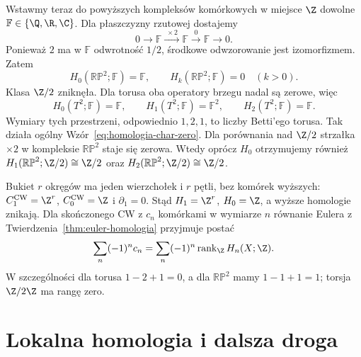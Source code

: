 \begin{przyklad}
\label{prz:zmiana-wspolczynnikow-rp2-torus}
Wstawmy teraz do powyższych kompleksów komórkowych
w miejsce $\Z$ dowolne
$\mathbb F\in\{\Q,\R,\C\}$.
Dla płaszczyzny rzutowej dostajemy
\[
 0\longrightarrow\mathbb F
 \xrightarrow{\;\times2\;}\mathbb F
 \xrightarrow{\;0\;}\mathbb F
 \longrightarrow0.
\]
Ponieważ $2$ ma w $\mathbb F$ odwrotność
$1/2$, środkowe odwzorowanie jest
izomorfizmem. Zatem
\[
 H_0(\mathbb{RP}^2;\mathbb F)=\mathbb F,
 \qquad H_k(\mathbb{RP}^2;\mathbb F)=0\quad(k>0).
\]
Klasa $\Z/2$ zniknęła. Dla torusa oba
operatory brzegu nadal są zerowe, więc
\[
 H_0(T^2;\mathbb F)=\mathbb F,\qquad
 H_1(T^2;\mathbb F)=\mathbb F^2,\qquad
 H_2(T^2;\mathbb F)=\mathbb F.
\]
Wymiary tych przestrzeni, odpowiednio
$1,2,1$, to liczby Betti'ego torusa.
Tak działa ogólny
Wzór~\eqref{eq:homologia-char-zero}.
Dla porównania nad $\Z/2$ strzałka
$\times2$ w kompleksie $\mathbb{RP}^2$
staje się zerowa. Wtedy oprócz $H_0$
otrzymujemy również
$H_1(\mathbb{RP}^2;\Z/2)\cong\Z/2$
oraz $H_2(\mathbb{RP}^2;\Z/2)\cong\Z/2$.
\end{przyklad}

\begin{przyklad}
\label{prz:homologia-bukiet}
Bukiet $r$ okręgów ma jeden
wierzchołek i $r$ pętli,
bez komórek wyższych:
$C_1^{\mathrm{CW}}=\Z^r$,
$C_0^{\mathrm{CW}}=\Z$ i
$\partial_1=0$.
Stąd $H_1=\Z^r$, $H_0=\Z$,
a wyższe homologie znikają.
Dla skończonego CW z
$c_n$ komórkami w wymiarze $n$
równanie Eulera z
Twierdzenia~\ref{thm:euler-homologia}
przyjmuje postać
\[
 \sum_n(-1)^n c_n
 =\sum_n(-1)^n
   \operatorname{rank}_{\Z} H_n(X;\Z).
\]
W szczególności dla torusa
$1-2+1=0$, a dla
$\mathbb{RP}^2$ mamy
$1-1+1=1$; torsja
$\Z/2\Z$ ma rangę zero.
\end{przyklad}

\section{Lokalna homologia i dalsza droga}
\label{sec:lokalna-homologia}


